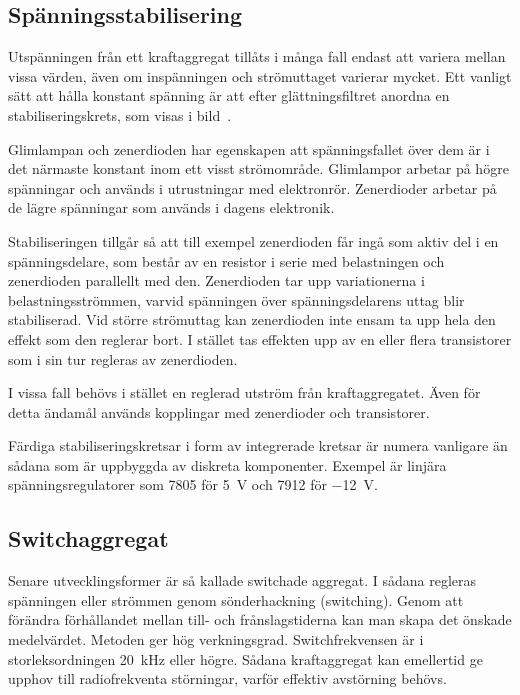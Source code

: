 
\subsection{Spänningsstabilisering}
\label{spänningsstabilisering}

Utspänningen från ett kraftaggregat tillåts i många fall endast att variera
mellan vissa värden, även om inspänningen och strömuttaget varierar mycket.
Ett vanligt sätt att hålla konstant spänning är att efter glättningsfiltret
anordna en stabiliseringskrets, som visas i bild~.

Glimlampan och zenerdioden har egenskapen att spänningsfallet över dem är i det
närmaste konstant inom ett visst strömområde.
Glimlampor arbetar på högre spänningar och används i utrustningar med
elektronrör.
Zenerdioder arbetar på de lägre spänningar som används i dagens elektronik.

Stabiliseringen tillgår så att till exempel zenerdioden får ingå som aktiv del
i en spänningsdelare, som består av en resistor i serie med belastningen och
zenerdioden parallellt med den.
Zenerdioden tar upp variationerna i belastningsströmmen, varvid spänningen över
spänningsdelarens uttag blir stabiliserad.
Vid större strömuttag kan zenerdioden inte ensam ta upp hela den effekt som den
reglerar bort.
I stället tas effekten upp av en eller flera transistorer som i sin tur
regleras av zenerdioden.

I vissa fall behövs i stället en reglerad utström från kraftaggregatet.
Även för detta ändamål används kopplingar med zenerdioder och transistorer.

Färdiga stabiliseringskretsar i form av integrerade kretsar är numera vanligare
än sådana som är uppbyggda av diskreta komponenter.
Exempel är linjära spänningsregulatorer som 7805 för \qty{5}{\volt} och 7912 för
\qty{-12}{\volt}.

\subsection{Switchaggregat}

Senare utvecklingsformer är så kallade switchade aggregat.
I sådana regleras spänningen eller strömmen genom sönderhackning (switching).
Genom att förändra förhållandet mellan till- och frånslagstiderna kan man skapa
det önskade medelvärdet.
Metoden ger hög verkningsgrad.
Switchfrekvensen är i storleksordningen \qty{20}{\kilo\hertz} eller högre.
Sådana kraftaggregat kan emellertid ge upphov till radiofrekventa störningar,
varför effektiv avstörning behövs.

